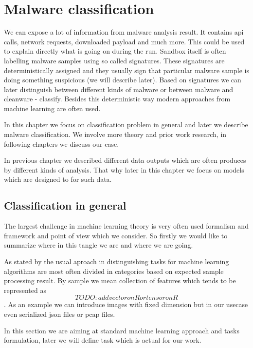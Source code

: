 \chapter{Malware classification}
We can expose a lot of information from malware analysis result. It contains api calls, network requests, downloaded payload and much more. This could be used to explain directly what is going on during the run. Sandbox itself is often labelling malware samples using so called signatures. These signatures are deterministically assigned and they usually sign that particular malware sample is doing something suspicious (we will describe later). Based on signatures we can later distinguish between different kinds of malware or between malware and cleanware - classify. Besides this deterministic way modern approaches from machine learning are often used.

In this chapter we focus on classification problem in general and later we describe malware classification. We involve more theory and prior work research, in following chapters we discuss our case.

In previous chapter we described different data outputs which are often produces by different kinds of analysis. That why later in this chapter we focus on models which are designed to for such data.

\section{Classification in general}


The largest challenge in machine learning theory is very often used formalism and framework and point of view which we consider. So firstly we would like to summarize where in this tangle we are and where we are going.

As stated by \citet{GoodBengCour16} the usual aproach in distinguishing tasks for machine learning algorithms are most often divided in categories based on expected sample processing result. By sample we mean collection of features which tends to be represented as $$TODO: add vector on R or tensor on R$$. As an example we can introduce images with fixed dimension but in our usecase even serialized json files or pcap files.

In this section we are aiming at standard machine learning approach and tasks formulation, later we will define task which is actual for our work.

